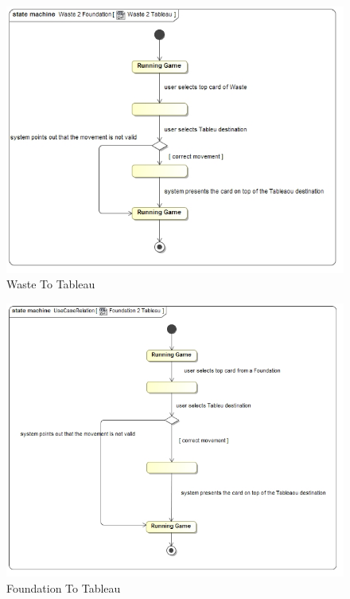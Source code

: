 \documentclass[11pt]{article}
\begin{document}
\begin{center}
 \begin{figure}[H]
 \begin{center}
   \includegraphics[width=14cm]{DomainModel/Waste2Tableau.jpg}
   \caption{Waste To Tableau}
   \label{fig:waste2tableau}
 \end{center}
 \end{figure}
\end{center}

\begin{center}
 \begin{figure}[H]
 \begin{center}
   \includegraphics[width=14cm]{DomainModel/Foundation2Tableau.jpg}
   \caption{Foundation To Tableau}
   \label{fig:foundation2tableau}
 \end{center}
 \end{figure}
\end{center}
\end{document}
